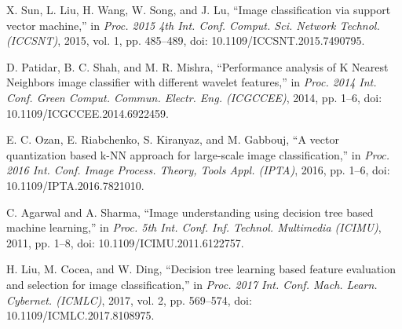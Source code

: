 \documentclass[12pt,a4paper]{report}
\begin{document}
\begin{thebibliography}{23}
	 X. Sun, L. Liu, H. Wang, W. Song, and J. Lu, ``Image classification via support vector machine,'' in \textit{Proc. 2015 4th Int. Conf. Comput. Sci. Network Technol. (ICCSNT)}, 2015, vol. 1, pp. 485--489, doi: 10.1109/ICCSNT.2015.7490795.
	
	 D. Patidar, B. C. Shah, and M. R. Mishra, ``Performance analysis of K Nearest Neighbors image classifier with different wavelet features,'' in \textit{Proc. 2014 Int. Conf. Green Comput. Commun. Electr. Eng. (ICGCCEE)}, 2014, pp. 1--6, doi: 10.1109/ICGCCEE.2014.6922459.
	
	 E. C. Ozan, E. Riabchenko, S. Kiranyaz, and M. Gabbouj, ``A vector quantization based k-NN approach for large-scale image classification,'' in \textit{Proc. 2016 Int. Conf. Image Process. Theory, Tools Appl. (IPTA)}, 2016, pp. 1--6, doi: 10.1109/IPTA.2016.7821010.
	
	 C. Agarwal and A. Sharma, ``Image understanding using decision tree based machine learning,'' in \textit{Proc. 5th Int. Conf. Inf. Technol. Multimedia (ICIMU)}, 2011, pp. 1--8, doi: 10.1109/ICIMU.2011.6122757.
	
	 H. Liu, M. Cocea, and W. Ding, ``Decision tree learning based feature evaluation and selection for image classification,'' in \textit{Proc. 2017 Int. Conf. Mach. Learn. Cybernet. (ICMLC)}, 2017, vol. 2, pp. 569--574, doi: 10.1109/ICMLC.2017.8108975.
	
\end{thebibliography}
\end{document}
